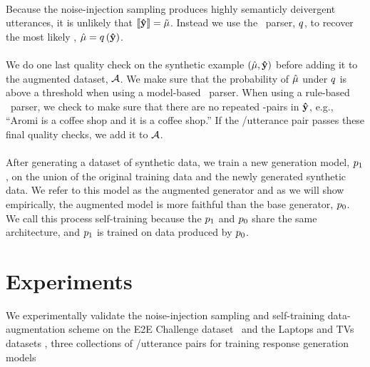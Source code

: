     \paragraph{} Because the noise-injection sampling produces highly
semanticly deivergent utterances, it is unlikely that $\left\llbracket \boldsymbol{\hat{\mathbf{y}}}  \right\rrbracket = \tilde{\mu}$. Instead we use the \meaningrepresentation~parser, $q$, to
recover the most likely \meaningrepresentation, $\hat{\mu} = q\left(\boldsymbol{\hat{\mathbf{y}}}\right)$.

\paragraph{}
We do one last quality check on the synthetic example $(\hat{\mu},\boldsymbol{\hat{\mathbf{y}}})$ before adding it to the augmented dataset, ${\mathcal{A}}$. We make sure that
the probability of $\hat{\mu}$ under $q$ is above a threshold when using
a model-based \meaningrepresentation~parser. When using a rule-based
\meaningrepresentation~parser, we check to make sure that there are no
repeated \attributevalue-pairs in $\boldsymbol{\hat{\mathbf{y}}}$, e.g., ``Aromi is a 
coffee shop and it is a coffee shop.'' If the \meaningrepresentation/utterance
pair passes these final quality checks, we add it to ${\mathcal{A}}$.

\paragraph{} After generating a dataset of synthetic data, we train a new 
generation model, $p_1$, on the union of the original training data
and the newly generated synthetic data. We refer to this model as 
the augmented generator and as we will show empirically, the augmented
model is more faithful than the base generator, $p_0$.
We call this process self-training because the $p_1$ and $p_0$ share 
the same architecture, and $p_1$ is trained on data produced by $p_0$.

\section{Experiments}

We experimentally validate the noise-injection sampling and self-training
data-augmentation scheme on the E2E Challenge dataset~\citep{something} 
and the Laptops and TVs datasets \citep{wen}, three collections of 
\meaningrepresentation/utterance pairs for training response generation models

